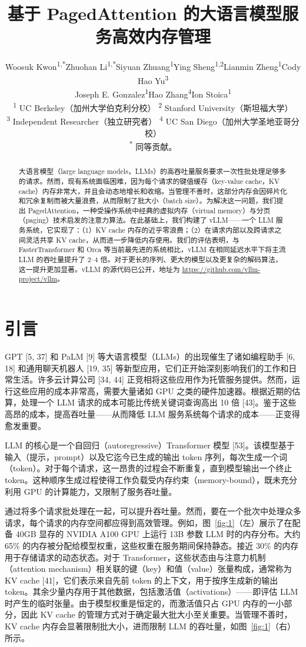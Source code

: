 \documentclass[11pt,UTF8,fontset=fandol]{ctexart}
\title{\textbf{基于 PagedAttention 的大语言模型服务高效内存管理}}
\author{%
Woosuk Kwon\textsuperscript{1,*}\quad Zhuohan Li\textsuperscript{1,*}\quad Siyuan Zhuang\textsuperscript{1}\quad Ying Sheng\textsuperscript{1,2}\quad Lianmin Zheng\textsuperscript{1}\quad Cody Hao Yu\textsuperscript{3}\\[2pt]
Joseph E. Gonzalez\textsuperscript{1}\quad Hao Zhang\textsuperscript{4}\quad Ion Stoica\textsuperscript{1}\\[6pt]
\normalsize\textsuperscript{1} UC Berkeley（加州大学伯克利分校）\quad
\textsuperscript{2} Stanford University（斯坦福大学）\\[2pt]
\normalsize\textsuperscript{3} Independent Researcher（独立研究者）\quad
\textsuperscript{4} UC San Diego（加州大学圣地亚哥分校）\\[4pt]
\normalsize\textsuperscript{*} 同等贡献。
}
\date{}
\begin{document}
\maketitle

\begin{abstract}
大语言模型（large language models，LLMs）的高吞吐量服务要求一次性批处理足够多的请求。然而，现有系统面临困难，因为每个请求的键值缓存（key-value cache，KV cache）内存非常大，并且会动态地增长和收缩。当管理不善时，这部分内存会因碎片化和冗余复制而被大量浪费，从而限制了批大小（batch size）。为解决这一问题，我们提出 PagedAttention，一种受操作系统中经典的虚拟内存（virtual memory）与分页（paging）技术启发的注意力算法。在此基础上，我们构建了 vLLM——一个 LLM 服务系统，它实现了：（1）KV cache 内存的近乎零浪费；（2）在请求内部以及跨请求之间灵活共享 KV cache，从而进一步降低内存使用。我们的评估表明，与 FasterTransformer 和 Orca 等当前最先进的系统相比，vLLM 在相同延迟水平下将主流 LLM 的吞吐量提升了 2--4 倍。对于更长的序列、更大的模型以及更复杂的解码算法，这一提升更加显著。vLLM 的源代码已公开，地址为 \url{https://github.com/vllm-project/vllm}。
\end{abstract}

\section{引言}

GPT [5, 37] 和 PaLM [9] 等大语言模型（LLMs）的出现催生了诸如编程助手 [6, 18] 和通用聊天机器人 [19, 35] 等新型应用，它们正开始深刻影响我们的工作和日常生活。许多云计算公司 [34, 44] 正竞相将这些应用作为托管服务提供。然而，运行这些应用的成本非常高，需要大量诸如 GPU 之类的硬件加速器。根据近期的估算，处理一个 LLM 请求的成本可能比传统关键词查询高出 10 倍 [43]。鉴于这些高昂的成本，提高吞吐量——从而降低 LLM 服务系统每个请求的成本——正变得愈发重要。

LLM 的核心是一个自回归（autoregressive）Transformer 模型 [53]。该模型基于输入（提示，prompt）以及它迄今已生成的输出 token 序列，每次生成一个词（token）。对于每个请求，这一昂贵的过程会不断重复，直到模型输出一个终止 token。这种顺序生成过程使得工作负载受内存约束（memory-bound），既未充分利用 GPU 的计算能力，又限制了服务吞吐量。

通过将多个请求批处理在一起，可以提升吞吐量。然而，要在一个批次中处理众多请求，每个请求的内存空间都应得到高效管理。例如，图~\ref{fig:1}（左）展示了在配备 40GB 显存的 NVIDIA A100 GPU 上运行 13B 参数 LLM 时的内存分布。大约 65\% 的内存被分配给模型权重，这些权重在服务期间保持静态。接近 30\% 的内存用于存储请求的动态状态。对于 Transformer，这些状态由与注意力机制（attention mechanism）相关联的键（key）和值（value）张量构成，通常称为 KV cache [41]，它们表示来自先前 token 的上下文，用于按序生成新的输出 token。其余少量内存用于其他数据，包括激活值（activations）——即评估 LLM 时产生的临时张量。由于模型权重是恒定的，而激活值只占 GPU 内存的一小部分，因此 KV cache 的管理方式对于确定最大批大小至关重要。当管理不善时，KV cache 内存会显著限制批大小，进而限制 LLM 的吞吐量，如图~\ref{fig:1}（右）所示。
\end{document}
